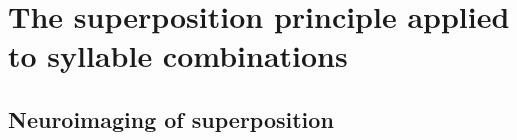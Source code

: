 








\section{The superposition principle applied to syllable combinations}

\subsection{Neuroimaging of superposition}



